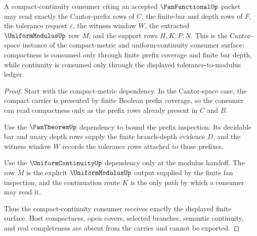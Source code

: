 \begin{theorem}
\label{thm:fan-functional-compact-continuity-consumer}
A compact-continuity consumer citing an accepted $\FanFunctionalUp$ packet may
read exactly the Cantor-prefix rows of $C$, the finite-bar and depth rows of
$F$, the tolerance request $\varepsilon$, the witness window $W$, the extracted
$\UniformModulusUp$ row $M$, and the support rows $H,K,P,N$. This is the
Cantor-space instance of the compact-metric and uniform-continuity consumer
surface: compactness is consumed only through finite prefix coverage and
finite bar depth, while continuity is consumed only through the displayed
tolerance-to-modulus ledger.
\end{theorem}
\begin{proof}
Start with the compact-metric dependency. In the Cantor-space case, the
compact carrier is presented by finite Boolean prefix coverage, so the consumer
can read compactness only as the prefix rows already present in $C$ and $B$.

Use the $\FanTheoremUp$ dependency to bound the prefix inspection. Its
decidable bar and unary depth rows supply the finite branch-depth evidence $D$,
and the witness window $W$ records the tolerance rows attached to those
prefixes.

Use the $\UniformContinuityUp$ dependency only at the modulus handoff. The row
$M$ is the explicit $\UniformModulusUp$ output supplied by the finite fan
inspection, and the continuation route $K$ is the only path by which a consumer
may read it.

Thus the compact-continuity consumer receives exactly the displayed finite
surface. Host compactness, open covers, selected branches, semantic continuity,
and real completeness are absent from the carrier and cannot be exported.
\end{proof}

